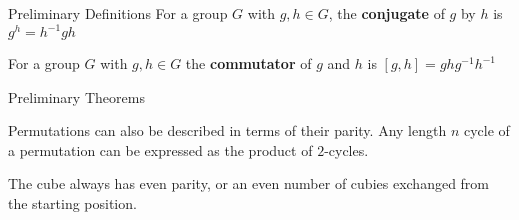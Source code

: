 \documentclass[final]{beamer}
\newlength{\colwidth}
\begin{document}
\begin{frame}[t]
\begin{columns}[t]
\begin{column}{\colwidth}
\begin{alertblock}{Preliminary Definitions}
For a group $G$ with $g,h \in G$, the \textbf{conjugate} of $g$ by $h$ is
$g^h = h^{-1}gh$ 

For a group $G$ with $g,h \in G$ 
the \textbf{commutator} of $g$ and $h$ is 
$[g,h]=ghg^{-1}h^{-1}$







  \end{alertblock}
 
  \begin{block}{Preliminary Theorems}

     Permutations can also be described in terms of their parity. Any length $n$
cycle of a permutation can be expressed as the product of $2$-cycles.

The cube always has even parity, or an even number of cubies
exchanged from the starting position.


\end{block}
\end{column}
\end{columns}
\end{frame}
\end{document}
